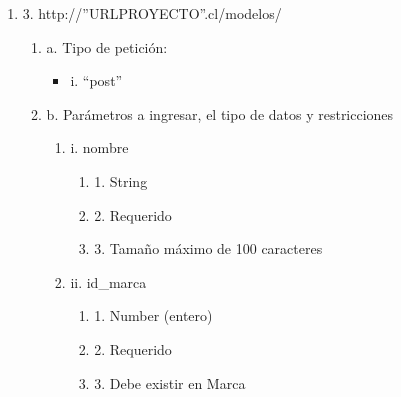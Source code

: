 \begin{enumerate}
    \item 3. http://”URLPROYECTO”.cl/modelos/
    \begin{enumerate}
        \item a. Tipo de petición:
            \begin{itemize}
               \item i. “post”
            \end{itemize}
        \item b. Parámetros a ingresar, el tipo de datos y restricciones
            \begin{enumerate}
                \item i. nombre
                    \begin{enumerate}
                        \item 1. String
                        \item 2. Requerido
                        \item 3. Tamaño máximo de 100 caracteres
                    \end{enumerate}
                \item ii. id\_marca
                    \begin{enumerate}
                        \item 1. Number (entero)
                        \item 2. Requerido
                        \item 3. Debe existir en Marca
                    \end{enumerate}
            \end{enumerate}
    \end{enumerate}


\end{enumerate}
